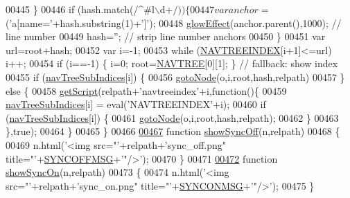 \begin{DoxyCode}
00445   \}
00446   \textcolor{keywordflow}{if} (hash.match(/^#l\(\backslash\)d+$/)) \{
00447     var anchor=$(\textcolor{stringliteral}{'a[name='}+hash.substring(1)+\textcolor{charliteral}{']'});
00448     \hyperlink{navtree_8js_a23b68d2deb28f9c2678f546e2d60e5ee}{glowEffect}(anchor.parent(),1000); \textcolor{comment}{// line number}
00449     hash=\textcolor{stringliteral}{''}; \textcolor{comment}{// strip line number anchors}
00450   \}
00451   var url=root+hash;
00452   var i=-1;
00453   \textcolor{keywordflow}{while} (\hyperlink{navtree_8js_a51b2088f00a4f2f20d495e65be359cd8}{NAVTREEINDEX}[i+1]<=url) i++;
00454   \textcolor{keywordflow}{if} (i==-1) \{ i=0; root=\hyperlink{navtree_8js_afc3e53a71ba26a8215797019b9b1451b}{NAVTREE}[0][1]; \} \textcolor{comment}{// fallback: show index}
00455   \textcolor{keywordflow}{if} (\hyperlink{navtree_8js_aee39e0d4ab2646ada03125bd7e750cf7}{navTreeSubIndices}[i]) \{
00456     \hyperlink{navtree_8js_a0e6a2d65190a43246d668bba554243e5}{gotoNode}(o,i,root,hash,relpath)
00457   \} \textcolor{keywordflow}{else} \{
00458     \hyperlink{navtree_8js_a32f4aac18d03aee747b55dea195731ac}{getScript}(relpath+\textcolor{stringliteral}{'navtreeindex'}+i,\textcolor{keyword}{function}()\{
00459       \hyperlink{navtree_8js_aee39e0d4ab2646ada03125bd7e750cf7}{navTreeSubIndices}[i] = eval(\textcolor{stringliteral}{'NAVTREEINDEX'}+i);
00460       \textcolor{keywordflow}{if} (\hyperlink{navtree_8js_aee39e0d4ab2646ada03125bd7e750cf7}{navTreeSubIndices}[i]) \{
00461         \hyperlink{navtree_8js_a0e6a2d65190a43246d668bba554243e5}{gotoNode}(o,i,root,hash,relpath);
00462       \}
00463     \},\textcolor{keyword}{true});
00464   \}
00465 \}
00466 
\hypertarget{navtree_8js_source_l00467}{}\hyperlink{navtree_8js_a6522b3f540ead0febf12ccf5fc1f04c4}{00467} \textcolor{keyword}{function} \hyperlink{navtree_8js_a6522b3f540ead0febf12ccf5fc1f04c4}{showSyncOff}(n,relpath)
00468 \{
00469     n.html(\textcolor{stringliteral}{'<img src="'}+relpath+\textcolor{stringliteral}{'sync\_off.png" title="'}+\hyperlink{navtree_8js_a8b93d8f469f8aeb3a0c17b922a2d32ed}{SYNCOFFMSG}+\textcolor{stringliteral}{'"/>'});
00470 \}
00471 
\hypertarget{navtree_8js_source_l00472}{}\hyperlink{navtree_8js_a84095390aca39b6cb693d3fb22d32dd0}{00472} \textcolor{keyword}{function} \hyperlink{navtree_8js_a84095390aca39b6cb693d3fb22d32dd0}{showSyncOn}(n,relpath)
00473 \{
00474     n.html(\textcolor{stringliteral}{'<img src="'}+relpath+\textcolor{stringliteral}{'sync\_on.png" title="'}+\hyperlink{navtree_8js_ab31fdb4752a1ada1b708d49d7482f948}{SYNCONMSG}+\textcolor{stringliteral}{'"/>'});
00475 \}

\end{DoxyCode}
